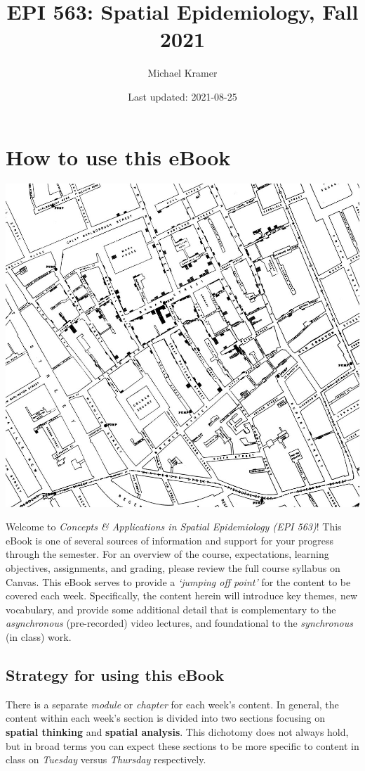 \documentclass[
]{book}
\title{EPI 563: Spatial Epidemiology, Fall 2021}
\author{Michael Kramer}
\date{Last updated: 2021-08-25}
\begin{document}
\maketitle

{
\setcounter{tocdepth}{1}
\tableofcontents
}
\hypertarget{how-to-use-this-ebook}{%
\chapter*{How to use this eBook}\label{how-to-use-this-ebook}}

\begin{center}\includegraphics[width=0.5\linewidth]{images/John-Snows-cholera-map-of-009} \end{center}

Welcome to \emph{Concepts \& Applications in Spatial Epidemiology (EPI 563)}! This eBook is one of several sources of information and support for your progress through the semester. For an overview of the course, expectations, learning objectives, assignments, and grading, please review the full course syllabus on Canvas. This eBook serves to provide a \emph{`jumping off point'} for the content to be covered each week. Specifically, the content herein will introduce key themes, new vocabulary, and provide some additional detail that is complementary to the \emph{asynchronous} (pre-recorded) video lectures, and foundational to the \emph{synchronous} (in class) work.

\hypertarget{strategy-for-using-this-ebook}{%
\section*{Strategy for using this eBook}\label{strategy-for-using-this-ebook}}

There is a separate \emph{module} or \emph{chapter} for each week's content. In general, the content within each week's section is divided into two sections focusing on \textbf{spatial thinking} and \textbf{spatial analysis}. This dichotomy does not always hold, but in broad terms you can expect these sections to be more specific to content in class on \emph{Tuesday} versus \emph{Thursday} respectively.
\end{document}
